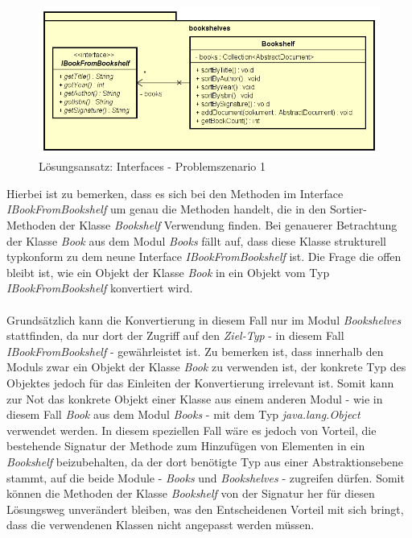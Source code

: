 \documentclass[11pt, 
ngerman,
doublespacing,
chapterinoneline, %
consistentlayout, %
]{scrartcl}
\begin{document}
\begin{figure}[h]
\centering
\includegraphics[scale=0.5]{pics/loesung_s1_interface.png}
\caption{Lösungsansatz: Interfaces - Problemszenario 1}
\label{solveInterface_PS1}
\end{figure} 
Hierbei ist zu bemerken, dass es sich bei den Methoden im Interface \emph{IBookFromBookshelf} um genau die Methoden handelt, die in den Sortier-Methoden der Klasse \emph{Bookshelf} Verwendung finden. Bei genauerer Betrachtung der Klasse \emph{Book} aus dem Modul \emph{Books} fällt auf, dass diese Klasse strukturell typkonform zu dem neune Interface \emph{IBookFromBookshelf} ist. Die Frage die offen bleibt ist, wie ein Objekt der Klasse \emph{Book} in ein Objekt vom Typ \emph{IBookFromBookshelf} konvertiert wird.\\\\
Grundsätzlich kann die Konvertierung in diesem Fall nur im Modul \emph{Bookshelves} stattfinden, da nur dort der Zugriff auf den \emph{Ziel-Typ} - in diesem Fall \emph{IBookFromBookshelf} - gewährleistet ist. Zu bemerken ist, dass innerhalb den Moduls zwar ein Objekt der Klasse \emph{Book} zu verwenden ist, der konkrete Typ des Objektes jedoch für das Einleiten der Konvertierung irrelevant ist. Somit kann zur Not das konkrete Objekt einer Klasse aus einem anderen Modul - wie in diesem Fall \emph{Book} aus dem Modul \emph{Books} - mit dem Typ \emph{java.lang.Object} verwendet werden. In diesem speziellen Fall wäre es jedoch von Vorteil, die bestehende Signatur der Methode zum Hinzufügen von Elementen in ein \emph{Bookshelf} beizubehalten, da der dort benötigte Typ aus einer Abstraktionsebene stammt, auf die beide Module - \emph{Books} und \emph{Bookshelves} - zugreifen dürfen. Somit können die Methoden der Klasse \emph{Bookshelf} von der Signatur her für diesen Lösungsweg unverändert bleiben, was den Entscheidenen Vorteil mit sich bringt, dass die verwendenen Klassen nicht angepasst werden müssen.\\\\
\end{document}
